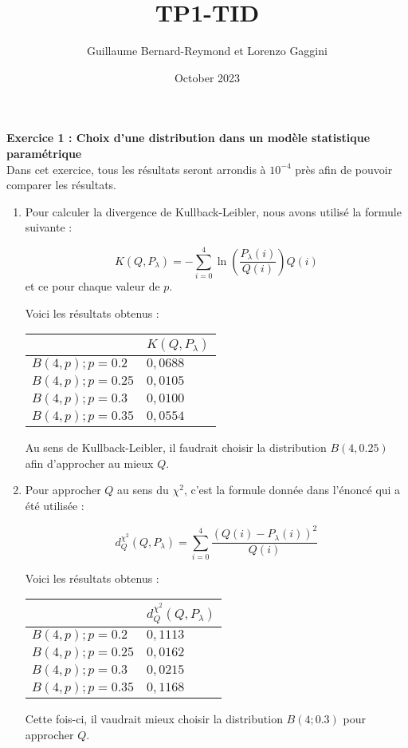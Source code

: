 \documentclass{article}
\title{TP1-TID}
\author{Guillaume Bernard-Reymond et Lorenzo Gaggini}
\date{October 2023}
\begin{document}
\newcommand{\norme}[1]{\left\| #1\right\|}
\newcommand{\tr}{\text{tr}}
\maketitle

\textbf{Exercice 1 : Choix d'une distribution dans un modèle statistique paramétrique} \\

Dans cet exercice, tous les résultats seront arrondis à $10^{-4}$ près afin de pouvoir comparer les résultats.

\begin{enumerate}
\item Pour calculer la divergence de Kullback-Leibler, nous avons utilisé la formule suivante : 

$$ K(Q,P_{\lambda}) =  - \sum_{i=0}^{4} \ln\left( \frac{P_{\lambda}(i)}{Q(i)} \right)Q(i)$$
et ce pour chaque valeur de $p$. 

Voici les résultats obtenus : 

  \begin{center}
    \begin{tabular}{|p{3cm}|>{\centering\arraybackslash}p{3cm}|}
  \hline 
   & $K(Q,P_{\lambda})$ \\ 
  \hline 
  $B(4,p) ; p=0.2$ & $0,0688$
 \\ 
  \hline 
  $B(4,p) ; p=0.25$ & $0,0105$
 \\ 
  \hline 
  $B(4,p) ; p=0.3$ & $0,0100$
 \\ 
  \hline 
  $B(4,p) ; p=0.35$ & $0,0554$
 \\ 
  \hline 
  \end{tabular} 
    \end{center}

Au sens de Kullback-Leibler, il faudrait choisir la distribution $B(4,0.25)$ afin d'approcher au mieux $Q$.

\item Pour approcher $Q$ au sens du $\chi^2$, c'est la formule donnée dans l'énoncé qui a été utilisée : 

$$d_{Q}^{\chi^2}(Q,P_{\lambda})= \sum_{i=0}^4 \frac{\left(Q(i)-P_{\lambda}(i)\right)^2 }{Q(i)}$$

Voici les résultats obtenus : 

  \begin{center}
    \begin{tabular}{|p{3cm}|>{\centering\arraybackslash}p{3cm}|}
  \hline 
   & $d_{Q}^{\chi^2}(Q,P_{\lambda})$ \\ 
  \hline 
  $B(4,p) ; p=0.2$ & $0,1113$
 \\ 
  \hline 
  $B(4,p) ; p=0.25$ & $0,0162$
 \\ 
  \hline 
  $B(4,p) ; p=0.3$ & $0,0215$
 \\ 
  \hline 
  $B(4,p) ; p=0.35$ & $0,1168$
 \\ 
  \hline 
  \end{tabular} 
    \end{center} 
    
Cette fois-ci, il vaudrait mieux choisir la distribution $B(4; 0.3)$ pour approcher $Q$.
\end{enumerate}
\end{document}
